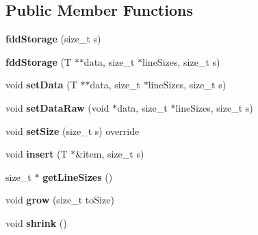\subsection*{Public Member Functions}
\begin{DoxyCompactItemize}
\item 
\hypertarget{classfaster_1_1fddStorage_3_01T_01_5_01_4_a949dbdd099a0dc2b54cec12cfb3f21b0}{}{\bfseries fdd\+Storage} (size\+\_\+t s)\label{classfaster_1_1fddStorage_3_01T_01_5_01_4_a949dbdd099a0dc2b54cec12cfb3f21b0}

\item 
\hypertarget{classfaster_1_1fddStorage_3_01T_01_5_01_4_a6272c1fb1e8bdff3c70f8fbe46c90fc4}{}{\bfseries fdd\+Storage} (T $\ast$$\ast$data, size\+\_\+t $\ast$line\+Sizes, size\+\_\+t s)\label{classfaster_1_1fddStorage_3_01T_01_5_01_4_a6272c1fb1e8bdff3c70f8fbe46c90fc4}

\item 
\hypertarget{classfaster_1_1fddStorage_3_01T_01_5_01_4_a4835be07a5ec230490f03da7cb8e3e16}{}void {\bfseries set\+Data} (T $\ast$$\ast$data, size\+\_\+t $\ast$line\+Sizes, size\+\_\+t s)\label{classfaster_1_1fddStorage_3_01T_01_5_01_4_a4835be07a5ec230490f03da7cb8e3e16}

\item 
\hypertarget{classfaster_1_1fddStorage_3_01T_01_5_01_4_aeb87efbfa61cc52dfc3bbdc3d09408dd}{}void {\bfseries set\+Data\+Raw} (void $\ast$data, size\+\_\+t $\ast$line\+Sizes, size\+\_\+t s)\label{classfaster_1_1fddStorage_3_01T_01_5_01_4_aeb87efbfa61cc52dfc3bbdc3d09408dd}

\item 
\hypertarget{classfaster_1_1fddStorage_3_01T_01_5_01_4_a5a918f95b08ed5a81fbb8831b0fc196e}{}void {\bfseries set\+Size} (size\+\_\+t s) override\label{classfaster_1_1fddStorage_3_01T_01_5_01_4_a5a918f95b08ed5a81fbb8831b0fc196e}

\item 
\hypertarget{classfaster_1_1fddStorage_3_01T_01_5_01_4_ae6b278b0a9dc5a96821438f0fb667489}{}void {\bfseries insert} (T $\ast$\&item, size\+\_\+t s)\label{classfaster_1_1fddStorage_3_01T_01_5_01_4_ae6b278b0a9dc5a96821438f0fb667489}

\item 
\hypertarget{classfaster_1_1fddStorage_3_01T_01_5_01_4_a44e871ff8dcd4b40f379330a78b6056a}{}size\+\_\+t $\ast$ {\bfseries get\+Line\+Sizes} ()\label{classfaster_1_1fddStorage_3_01T_01_5_01_4_a44e871ff8dcd4b40f379330a78b6056a}

\item 
\hypertarget{classfaster_1_1fddStorage_3_01T_01_5_01_4_a76493eba9895f152a95b547a2485bc3a}{}void {\bfseries grow} (size\+\_\+t to\+Size)\label{classfaster_1_1fddStorage_3_01T_01_5_01_4_a76493eba9895f152a95b547a2485bc3a}

\item 
\hypertarget{classfaster_1_1fddStorage_3_01T_01_5_01_4_adac945484d94be1469e4cf9eb6e8c16c}{}void {\bfseries shrink} ()\label{classfaster_1_1fddStorage_3_01T_01_5_01_4_adac945484d94be1469e4cf9eb6e8c16c}

\end{DoxyCompactItemize}

